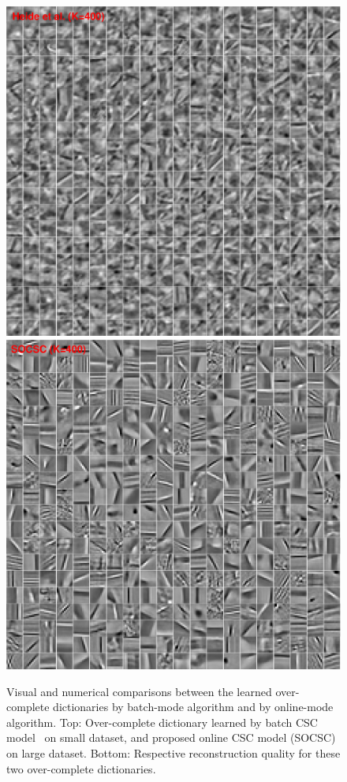 \begin{figure}[h]
\centering
  \includegraphics[width=0.7\linewidth]{figure/heide400-supple.pdf}
  \includegraphics[width=0.7\linewidth]{figure/online400-supple.pdf}
  \vspace{0.2cm}

  \caption{ Visual and numerical comparisons between the learned over-complete dictionaries by batch-mode algorithm and by online-mode algorithm. Top: Over-complete dictionary learned by batch CSC model~\cite{heide2015fast} on small dataset, and proposed online CSC model (SOCSC) on large dataset. Bottom: Respective reconstruction quality for these two over-complete dictionaries.}
  \label{fig:overCompleteDic-dataset}
\end{figure} 